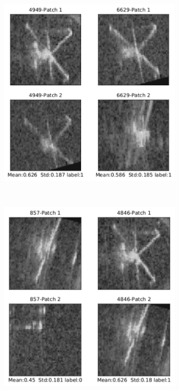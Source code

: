 \begin{figure}[ht]
  \centering
  \begin{subfigure}[b]{4.2cm}
    \includegraphics[width=\textwidth]{images/densenet/prediction_images_highest_stds_1_grey}
    \label{fig:prediction_images_highest_stds_1}
  \end{subfigure}
  ~ %
  \begin{subfigure}[b]{4.2cm}
    \includegraphics[width=\textwidth]{images/densenet/prediction_images_highest_stds_2_grey}

\end{subfigure}
\end{figure}

